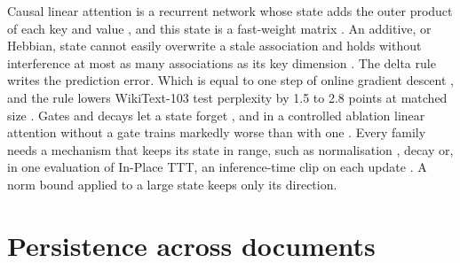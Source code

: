 \documentclass[12pt,a4paper]{report}
\begin{document}
Causal linear attention is a recurrent network whose state adds the outer product of each key and value \citep{katharopoulos2020transformers}, and this state is a fast-weight matrix \citep{schlag2021linear}. An additive, or Hebbian, state cannot easily overwrite a stale association and holds without interference at most as many associations as its key dimension \citep{schlag2021linear,yang2024deltanet}. The delta rule \citep{widrow1960adaptive} writes the prediction error. Which is equal to one step of online gradient descent \citep{yang2024deltanet}, and the rule lowers WikiText-103 test perplexity by 1.5 to 2.8 points at matched size \citep{schlag2021linear}. Gates and decays let a state forget \citep{ba2016using,mao2022finetuning,yang2025gated}, and in a controlled ablation linear attention without a gate trains markedly worse than with one \citep{yang2024gla}. Every family needs a mechanism that keeps its state in range, such as normalisation \citep{zhang2025test}, decay \citep{ba2016using} or, in one evaluation of In-Place TTT, an inference-time clip on each update \citep{feng2026inplace}. A norm bound applied to a large state keeps only its direction.

\section{Persistence across documents}
\end{document}
